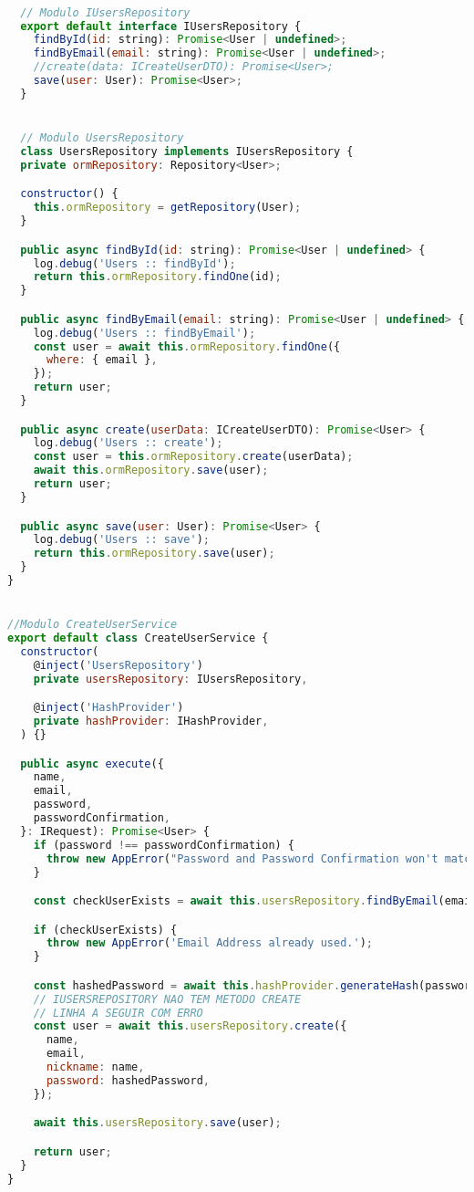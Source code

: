 \begin{lstlisting}[language=JavaScript, caption={Violando o LSP},captionpos=b, label=alg:lspviolation]

  // Modulo IUsersRepository
  export default interface IUsersRepository {
    findById(id: string): Promise<User | undefined>;
    findByEmail(email: string): Promise<User | undefined>;
    //create(data: ICreateUserDTO): Promise<User>;
    save(user: User): Promise<User>;
  }


  // Modulo UsersRepository
  class UsersRepository implements IUsersRepository {
  private ormRepository: Repository<User>;

  constructor() {
    this.ormRepository = getRepository(User);
  }

  public async findById(id: string): Promise<User | undefined> {
    log.debug('Users :: findById');
    return this.ormRepository.findOne(id);
  }

  public async findByEmail(email: string): Promise<User | undefined> {
    log.debug('Users :: findByEmail');
    const user = await this.ormRepository.findOne({
      where: { email },
    });
    return user;
  }

  public async create(userData: ICreateUserDTO): Promise<User> {
    log.debug('Users :: create');
    const user = this.ormRepository.create(userData);
    await this.ormRepository.save(user);
    return user;
  }

  public async save(user: User): Promise<User> {
    log.debug('Users :: save');
    return this.ormRepository.save(user);
  }
}


//Modulo CreateUserService
export default class CreateUserService {
  constructor(
    @inject('UsersRepository')
    private usersRepository: IUsersRepository,

    @inject('HashProvider')
    private hashProvider: IHashProvider,
  ) {}

  public async execute({
    name,
    email,
    password,
    passwordConfirmation,
  }: IRequest): Promise<User> {
    if (password !== passwordConfirmation) {
      throw new AppError("Password and Password Confirmation won't match");
    }

    const checkUserExists = await this.usersRepository.findByEmail(email);

    if (checkUserExists) {
      throw new AppError('Email Address already used.');
    }

    const hashedPassword = await this.hashProvider.generateHash(password);
    // IUSERSREPOSITORY NAO TEM METODO CREATE
    // LINHA A SEGUIR COM ERRO
    const user = await this.usersRepository.create({ 
      name,
      email,
      nickname: name,
      password: hashedPassword,
    });

    await this.usersRepository.save(user);

    return user;
  }
}

  \end{lstlisting}